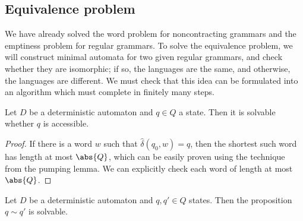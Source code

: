 \subsection{Equivalence problem}
We have already solved the word problem for noncontracting grammars and the emptiness problem for regular grammars.
To solve the equivalence problem, we will construct minimal automata for two given regular grammars, and check whether they are isomorphic; if so, the languages are the same, and otherwise, the languages are different.
We must check that this idea can be formulated into an algorithm which must complete in finitely many steps.
\begin{proposition}
	Let \( D \) be a deterministic automaton and \( q \in Q \) a state.
	Then it is solvable whether \( q \) is accessible.
\end{proposition}
\begin{proof}
	If there is a word \( w \) such that \( \hat\delta(q_0,w) = q \), then the shortest such word has length at most \( \abs{Q} \), which can be easily proven using the technique from the pumping lemma.
	We can explicitly check each word of length at most \( \abs{Q} \).
\end{proof}
\begin{theorem}
	Let \( D \) be a deterministic automaton and \( q, q' \in Q \) states.
	Then the proposition \( q \sim q' \) is solvable.
\end{theorem}
